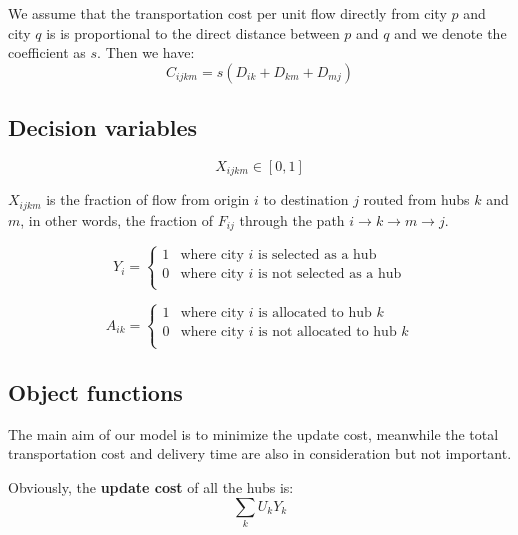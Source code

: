 \documentclass{llncs}
\begin{document}
	We assume that the transportation cost per unit flow directly from city $p$ and city $q$ is is proportional to the direct distance between $p$ and $q$ and we denote the coefficient as $s$. Then we have:
	\begin{equation}
	C_{ijkm} = s(D_{ik}+D_{km}+D_{mj})
	\label{eq:c}
	\end{equation}
	
	\subsection{Decision variables}
	
	\begin{equation}
	X_{ijkm} \in [0,1]
	\end{equation}
	
	$X_{ijkm}$ is the fraction of flow from origin $i$ to destination $j$ routed from hubs $k$ and $m$, in other words, the fraction of $F_{ij}$ through the path $i \rightarrow k \rightarrow m\rightarrow j$.
	
	\begin{equation}\label{}
	Y_{i} = 
	\left\{  
	\begin{array}{ll}  
	1 & \text{where city $i$ is selected as a hub} \\  
	0 &  \text{where city $i$ is not selected as a hub}\\      
	\end{array}  
	\right.  
	\end{equation}
	
	\begin{equation}\label{}
	A_{ik} = 
	\left\{  
	\begin{array}{ll}  
	1 & \text{where city $i$ is allocated to hub $k$} \\  
	0 &  \text{where city $i$ is not allocated to hub $k$}\\      
	\end{array}  
	\right.  
	\end{equation}
	
\subsection{Object functions}
	The main aim of our model is to minimize the update cost, meanwhile the total transportation cost and delivery time are also in consideration but not important.
	
	Obviously, the \textbf{update cost} of all the hubs is:
	\begin{equation}
	    \sum_{k}U_k Y_{k}
	\end{equation}
	
\end{document}
